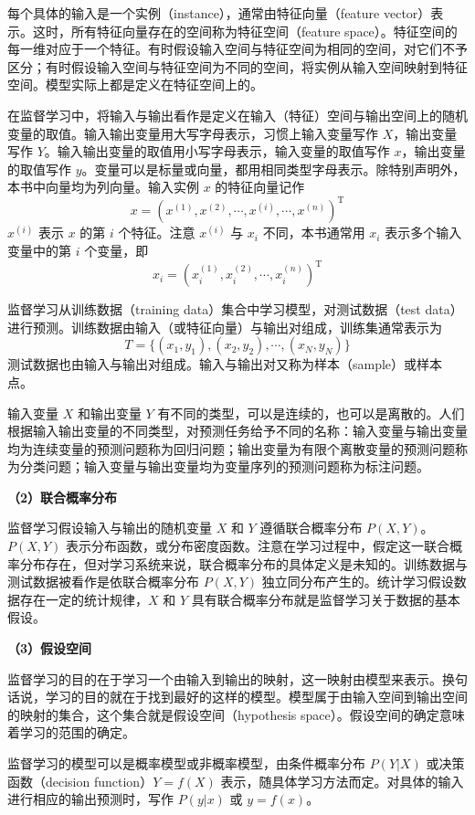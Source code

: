 \documentclass[UTF8,12pt,a4paper,fontset=fandol]{ctexart}
\begin{document}
每个具体的输入是一个实例（instance），通常由特征向量（feature vector）表示。这时，所有特征向量存在的空间称为特征空间（feature space）。特征空间的每一维对应于一个特征。有时假设输入空间与特征空间为相同的空间，对它们不予区分；有时假设输入空间与特征空间为不同的空间，将实例从输入空间映射到特征空间。模型实际上都是定义在特征空间上的。

在监督学习中，将输入与输出看作是定义在输入（特征）空间与输出空间上的随机变量的取值。输入输出变量用大写字母表示，习惯上输入变量写作 $X$，输出变量写作 $Y$。输入输出变量的取值用小写字母表示，输入变量的取值写作 $x$，输出变量的取值写作 $y$。变量可以是标量或向量，都用相同类型字母表示。除特别声明外，本书中向量均为列向量。输入实例 $x$ 的特征向量记作
\[
  x=\left(x^{(1)},x^{(2)},\cdots,x^{(i)},\cdots,x^{(n)}\right)^{\mathrm T}
\]
$x^{(i)}$ 表示 $x$ 的第 $i$ 个特征。注意 $x^{(i)}$ 与 $x_i$ 不同，本书通常用 $x_i$ 表示多个输入变量中的第 $i$ 个变量，即
\[
  x_i=\left(x_i^{(1)},x_i^{(2)},\cdots,x_i^{(n)}\right)^{\mathrm T}
\]

监督学习从训练数据（training data）集合中学习模型，对测试数据（test data）进行预测。训练数据由输入（或特征向量）与输出对组成，训练集通常表示为
\[
  T=\{(x_1,y_1),(x_2,y_2),\cdots,(x_N,y_N)\}
\]
测试数据也由输入与输出对组成。输入与输出对又称为样本（sample）或样本点。

输入变量 $X$ 和输出变量 $Y$ 有不同的类型，可以是连续的，也可以是离散的。人们根据输入输出变量的不同类型，对预测任务给予不同的名称：输入变量与输出变量均为连续变量的预测问题称为回归问题；输出变量为有限个离散变量的预测问题称为分类问题；输入变量与输出变量均为变量序列的预测问题称为标注问题。

\noindent\textbf{（2）联合概率分布}

监督学习假设输入与输出的随机变量 $X$ 和 $Y$ 遵循联合概率分布 $P(X,Y)$。$P(X,Y)$ 表示分布函数，或分布密度函数。注意在学习过程中，假定这一联合概率分布存在，但对学习系统来说，联合概率分布的具体定义是未知的。训练数据与测试数据被看作是依联合概率分布 $P(X,Y)$ 独立同分布产生的。统计学习假设数据存在一定的统计规律，$X$ 和 $Y$ 具有联合概率分布就是监督学习关于数据的基本假设。

\noindent\textbf{（3）假设空间}

监督学习的目的在于学习一个由输入到输出的映射，这一映射由模型来表示。换句话说，学习的目的就在于找到最好的这样的模型。模型属于由输入空间到输出空间的映射的集合，这个集合就是假设空间（hypothesis space）。假设空间的确定意味着学习的范围的确定。

监督学习的模型可以是概率模型或非概率模型，由条件概率分布 $P(Y|X)$ 或决策函数（decision function）$Y=f(X)$ 表示，随具体学习方法而定。对具体的输入进行相应的输出预测时，写作 $P(y|x)$ 或 $y=f(x)$。
\end{document}
